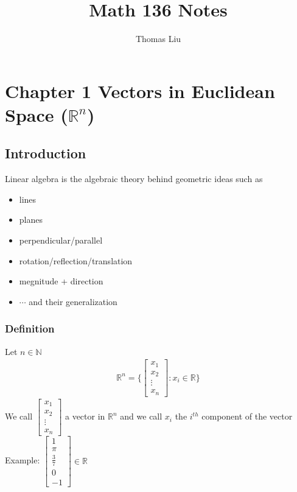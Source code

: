 \documentclass[12pt, letterpaper]{article}
\title{Math 136 Notes}
\author{Thomas Liu}
\begin{document}
\maketitle
\tableofcontents

\newpage

\section{Chapter 1 Vectors in Euclidean Space ($\mathbb{R}^n$)}
\subsection{Introduction}
Linear algebra is the algebraic theory behind geometric ideas such as
\begin{itemize}
    \item lines
    \item planes
    \item perpendicular/parallel
    \item rotation/reflection/translation
    \item megnitude + direction
    \item[] $\cdots$ and their generalization
\end{itemize}
\subsubsection*{Definition}
Let $n\in\mathbb{N}$
\begin{align*}
    \mathbb{R}^n = \{
    \begin{bmatrix}
        x_1 \\ x_2 \\ \vdots \\ x_n
    \end{bmatrix}
    : x_i \in \mathbb{R} \}
\end{align*}
We call $\begin{bmatrix} x_1 \\ x_2 \\ \vdots \\ x_n \end{bmatrix}$ a vector in $\mathbb{R}^n$ and 
we call $x_i$ the $i^{th}$ component of the vector \\
Example: $\begin{bmatrix} 1 \\ \pi \\ \frac{3}{7} \\ 0 \\ -1 \end{bmatrix} \in \mathbb{R}$
\end{document}
